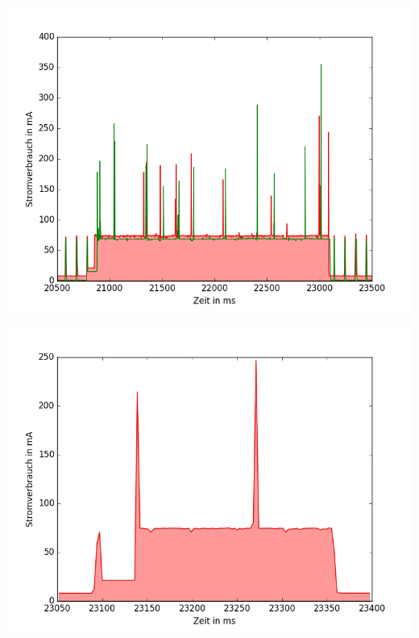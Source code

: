 \documentclass[18pt]{beamer}
\begin{document}
\begin{frame}
	\begin{minipage}[c][\textheight][c]{\textwidth}
		\centering
		\includegraphics[height=0.95\textheight]{plots/wifillssendv.png}
	\end{minipage}
\end{frame}
\begin{frame}
	\begin{minipage}[c][\textheight][c]{\textwidth}
		\centering
		\includegraphics[height=0.95\textheight]{plots/wifills1chsend.png}
	\end{minipage}
\end{frame}
\end{document}

